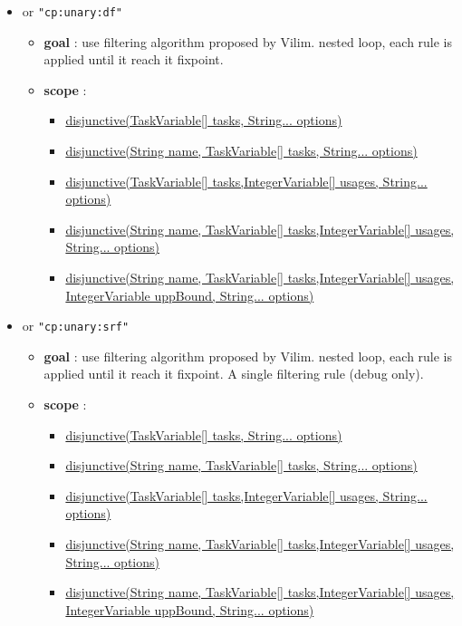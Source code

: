 \begin{itemize}
		\item \label{cdisjunctivedf:cdisjunctivedfoptions}\hypertarget{cdisjunctivedf:cdisjunctivedfoptions}{}				
		 or \texttt{"cp:unary:df"}
		\begin{itemize}
				\item \textbf{goal} : use filtering algorithm proposed by Vilim. nested loop, each rule is applied until it reach it fixpoint.
				\item \textbf{scope} : 
					\begin{itemize}
						\item \hyperlink{disjunctive:disjunctiveconstraint}{disjunctive(TaskVariable[] tasks, String... options) }
						\item \hyperlink{disjunctive:disjunctiveconstraint}{disjunctive(String name, TaskVariable[] tasks, String... options)}													\item \hyperlink{disjunctive:disjunctiveconstraint}{disjunctive(TaskVariable[] tasks,IntegerVariable[] usages, String... options)}
						\item \hyperlink{disjunctive:disjunctiveconstraint}{disjunctive(String name, TaskVariable[] tasks,IntegerVariable[] usages, String... options)}							
						\item \hyperlink{disjunctive:disjunctiveconstraint}{disjunctive(String name, TaskVariable[] tasks,IntegerVariable[] usages, IntegerVariable uppBound, String... options)}
					\end{itemize}
		\end{itemize}
		
		\item \label{cdisjunctivesrf:cdisjunctivesrfoptions}\hypertarget{cdisjunctivesrf:cdisjunctivesrfoptions}{}				
		 or \texttt{"cp:unary:srf"}
		\begin{itemize}
				\item \textbf{goal} : use filtering algorithm proposed by Vilim. nested loop, each rule is applied until it reach it fixpoint. A single filtering rule (debug only).
				\item \textbf{scope} : 
					\begin{itemize}
						\item \hyperlink{disjunctive:disjunctiveconstraint}{disjunctive(TaskVariable[] tasks, String... options) }
						\item \hyperlink{disjunctive:disjunctiveconstraint}{disjunctive(String name, TaskVariable[] tasks, String... options)}													\item \hyperlink{disjunctive:disjunctiveconstraint}{disjunctive(TaskVariable[] tasks,IntegerVariable[] usages, String... options)}
						\item \hyperlink{disjunctive:disjunctiveconstraint}{disjunctive(String name, TaskVariable[] tasks,IntegerVariable[] usages, String... options)}							
						\item \hyperlink{disjunctive:disjunctiveconstraint}{disjunctive(String name, TaskVariable[] tasks,IntegerVariable[] usages, IntegerVariable uppBound, String... options)}
					\end{itemize}
		\end{itemize}		


\end{itemize}
